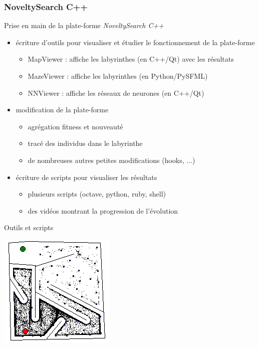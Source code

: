 \documentclass{beamer}
\begin{document}
\begin{frame}
\frametitle{NoveltySearch C++}
Prise en main de la plate-forme \emph{NoveltySearch C++}
\begin{itemize}
    \item écriture d'outils pour visualiser et étudier le fonctionnement de la plate-forme
    \begin{itemize}
        \item MapViewer : affiche les labyrinthes (en C++/Qt) avec les résultats
        \item MazeViewer : affiche les labyrinthes (en Python/PySFML)
        \item NNViewer : affiche les réseaux de neurones (en C++/Qt)
    \end{itemize}
    \item modification de la plate-forme
    \begin{itemize}
        \item agrégation fitness et nouveauté
        \item tracé des individus dans le labyrinthe
        \item de nombreuses autres petites modifications (hooks, ...)
    \end{itemize}
    \item écriture de scripts pour visualiser les résultats
    \begin{itemize}
        \item plusieurs scripts (octave, python, ruby, shell)
        \item des vidéos montrant la progression de l'évolution
    \end{itemize}
\end{itemize}
\end{frame}


\begin{frame}{Outils et scripts}
\begin{center}
    \includegraphics[width=.65\linewidth]{images/hard_nov}
\end{center}
\end{frame}
\end{document}
